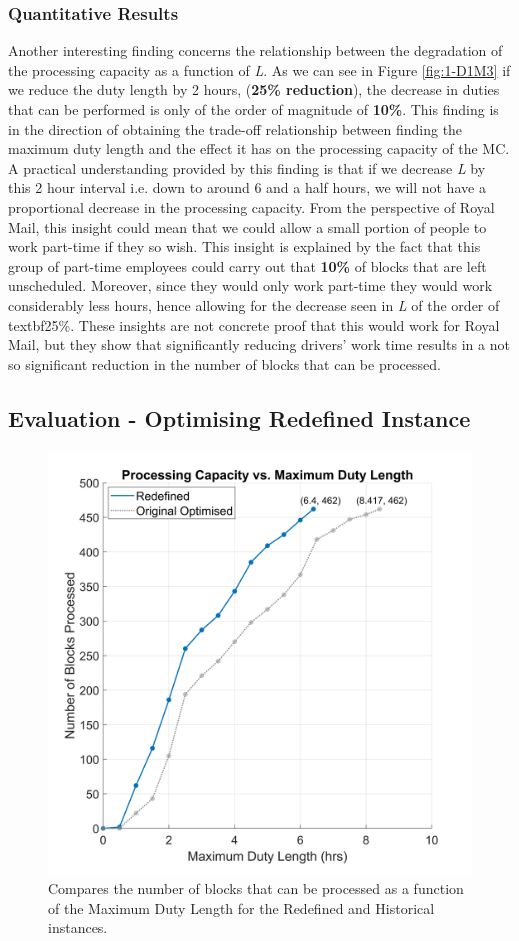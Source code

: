 \subsubsection*{Quantitative Results}
Another interesting finding concerns the relationship between the degradation of the processing capacity as a function of \textit{L}. As we can see in Figure \ref{fig:1-D1M3} if we reduce the duty length by 2 hours, (\textbf{25\% reduction}), the decrease in duties that can be performed is only of the order of magnitude of \textbf{10\%}. This finding is in the direction of obtaining the trade-off relationship between finding the maximum duty length and the effect it has on the processing capacity of the MC. A practical understanding provided by this finding is that if we decrease \textit{L} by this 2 hour interval i.e. down to around 6 and a half hours, we will not have a proportional decrease in the processing capacity. From the perspective of Royal Mail, this insight could mean that we could allow a small portion of people to work part-time if they so wish. This insight is explained by the fact that this group of part-time employees could carry out that \textbf{10\%} of blocks that are left unscheduled. Moreover, since they would only work part-time they would work considerably less hours, hence allowing for the decrease seen in \textit{L} of the order of textbf{25\%}. These insights are not concrete proof that this would work for Royal Mail, but they show that significantly reducing drivers' work time results in a not so significant reduction in the number of blocks that can be processed.

\subsection*{Evaluation - Optimising Redefined Instance}


\begin{figure}%
    \centering
    \includegraphics[width=0.46\linewidth]{[1] - chapter/Image Files/1-D2M3.png}
    \caption{Compares the number of blocks that can be processed as a function of the Maximum Duty Length for the Redefined and Historical instances.}
    \label{fig:1-D2M3}
\end{figure}

